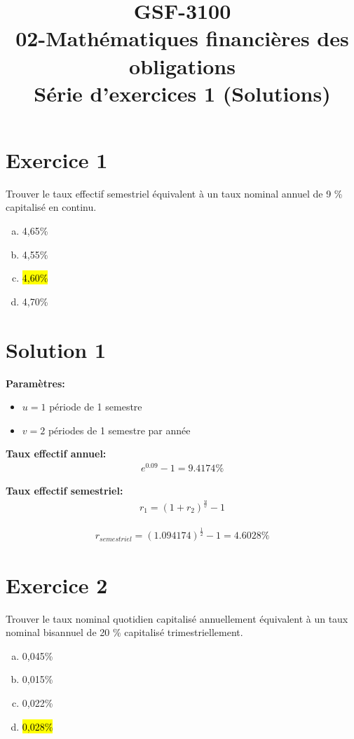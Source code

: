 \documentclass[10pt,a4paper]{article}
\title{GSF-3100 \\
02-Mathématiques financières des obligations \\
Série d'exercices 1 (Solutions)}
\begin{document}
\maketitle

\newpage

\section*{Exercice 1}
Trouver le taux effectif semestriel équivalent à un taux nominal annuel de 9 \% capitalisé en continu.

\begin{enumerate}[a)]
\item 4,65\%
\item 4,55\%
\item \hl{4,60\%}
\item 4,70\%
\end{enumerate}

\section*{Solution 1}

\textbf{Paramètres:}
\begin{itemize}
\item $u = 1$ période de 1 semestre
\item $v = 2$ périodes de 1 semestre par année
\end{itemize}

\textbf{Taux effectif annuel:}
\begin{align*}
e^{0.09}-1 = 9.4174 \%
\end{align*}

\textbf{Taux effectif semestriel:}
\begin{align*}
r_1 = (1+r_2)^{\frac{u}{v}}-1
\end{align*}

\begin{align*}
r_{semestriel} = (1.094174)^{\frac{1}{2}}-1 = 4.6028 \%
\end{align*}

\newpage


\section*{Exercice 2}
Trouver le taux nominal quotidien capitalisé annuellement équivalent à un taux nominal bisannuel de 20 \% capitalisé trimestriellement.

\begin{enumerate}[a)]
\item 0,045\%
\item 0,015\%
\item 0,022\%
\item \hl{0,028\%}
\end{enumerate}
\end{document}

